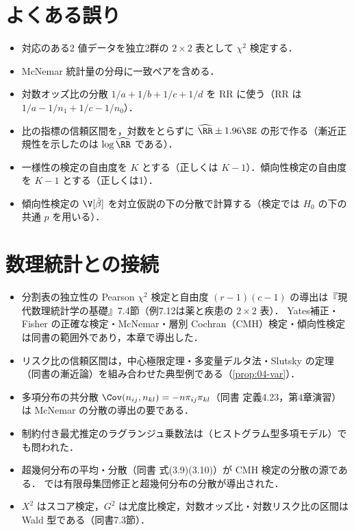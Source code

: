 \section{よくある誤り}\label{sec:04-err}
\begin{warnbox}
\begin{itemize}
\item 対応のある2 値データを独立2群の $2\times2$ 表として $\chi^2$ 検定する．
\item McNemar 統計量の分母に一致ペアを含める．
\item 対数オッズ比の分散 $1/a+1/b+1/c+1/d$ を RR に使う（RR は $1/a-1/n_1+1/c-1/n_0$）．
\item 比の指標の信頼区間を，対数をとらずに $\widehat{\RR}\pm1.96\SE$ の形で作る（漸近正規性を示したのは $\log\widehat{\RR}$ である）．
\item 一様性の検定の自由度を $K$ とする（正しくは $K-1$）．傾向性検定の自由度を $K-1$ とする（正しくは1）．
\item 傾向性検定の $\V[\hat\beta]$ を対立仮説の下の分散で計算する（検定では $H_0$ の下の共通 $p$ を用いる）．
\end{itemize}
\end{warnbox}

\section{数理統計との接続}\label{sec:04-link}
\begin{linkbox}
\begin{itemize}
\item 分割表の独立性の Pearson $\chi^2$ 検定と自由度 $(r-1)(c-1)$ の導出は『現代数理統計学の基礎』7.4節（例7.12は薬と疾患の $2\times2$ 表）．
      Yates補正・Fisher の正確な検定・McNemar・層別 Cochran（CMH）検定・傾向性検定は同書の範囲外であり，本章で導出した．
\item リスク比の信頼区間は，中心極限定理・多変量デルタ法・Slutsky の定理（同書の漸近論）を組み合わせた典型例である（\cref{prop:04-var}）．
\item 多項分布の共分散 $\Cov(n_{ij},n_{kl})=-n\pi_{ij}\pi_{kl}$（同書 定義4.23，第4章演習）は McNemar の分散の導出の要である．
\item 制約付き最尤推定のラグランジュ乗数法は（ヒストグラム型多項モデル）でも問われた．
\item 超幾何分布の平均・分散（同書 式(3.9)(3.10)）が CMH 検定の分散の源である． では有限母集団修正と超幾何分布の分散が導出された．
\item $X^2$ はスコア検定，$G^2$ は尤度比検定，対数オッズ比・対数リスク比の区間は Wald 型である（同書7.3節）．
\end{itemize}
\end{linkbox}

